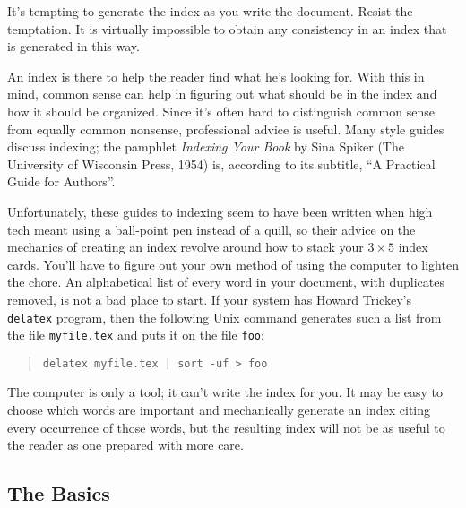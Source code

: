 It's tempting to generate the index as you write the document.  Resist
the temptation.  It is virtually impossible to obtain any consistency
in an index that is  generated in this way.

An index is there to help the reader find what he's looking for.  With
this in mind, common sense can help in figuring out what should be in
the index and how it should be organized.  Since it's often hard to
distinguish common sense from equally common nonsense, professional
advice is useful.  Many style guides discuss indexing; the pamphlet
{\em Indexing Your Book\/} by Sina Spiker (The University of Wisconsin
Press, 1954) is, according to its subtitle, ``A Practical
Guide for Authors''.  

Unfortunately, these guides to indexing seem to have been written when
high tech meant using a ball-point pen instead of a quill, so their
advice on the mechanics of creating an index revolve around how to
stack your $3\times 5$ index cards.  You'll have to figure out your own
method of using the computer to lighten the chore.  An alphabetical
list of every word in your document, with duplicates removed, is not a
bad place to start.  If your system has Howard Trickey's {\tt delatex}
program, then the following Unix command generates such a list from the
file {\tt myfile.tex} and puts it on the file {\tt foo}:
\begin{quote}
\tt delatex myfile.tex | sort -uf > foo
\end{quote}

The computer is only a tool; it can't write the index for you.  It may
be easy to choose which words are important and mechanically generate
an index citing every occurrence of those words, but the resulting
index will not be as useful to the reader as one prepared with more
care.




\subsection{The Basics}

